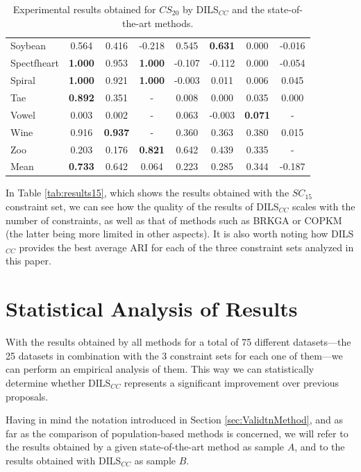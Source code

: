 \documentclass[review]{elsarticle}
\begin{document}
\begin{table}[!h]
{\begin{tabular}{lccccccc}
			Soybean & 0.564 & 0.416 & -0.218 & 0.545 & \textbf{0.631} & 0.000 & -0.016 \\
			Spectfheart & \textbf{1.000} & 0.953 & \textbf{1.000} & -0.107 & -0.112 & 0.000 & -0.054 \\
			Spiral & \textbf{1.000} & 0.921 & \textbf{1.000} & -0.003 & 0.011 & 0.006 & 0.045 \\
			Tae & \textbf{0.892} & 0.351 & - & 0.008 & 0.000 & 0.035 & 0.000 \\
			Vowel & 0.003 & 0.002 & - & 0.063 & -0.003 & \textbf{0.071} & - \\
			Wine & 0.916 & \textbf{0.937} & - & 0.360 & 0.363 & 0.380 & 0.015 \\
			Zoo & 0.203 & 0.176 & \textbf{0.821} & 0.642 & 0.439 & 0.335 & - \\
			\hline
			Mean & \textbf{0.733} & 0.642 & 0.064 & 0.223 & 0.285 & 0.344 & -0.187 \\
			\hline
			
		\end{tabular}}
		
	\caption{Experimental results obtained for $CS_{20}$ by DILS$_{CC}$ and the state-of-the-art methods.}
	\label{tab:results20}
\end{table}
	
In Table \ref{tab:results15}, which shows the results obtained with the $SC_{15}$ constraint set, we can see how the quality of the results of DILS$_{CC}$ scales with the number of constraints, as well as that of methods such as BRKGA or COPKM (the latter being more limited in other aspects). It is also worth noting how DILS$_{CC}$ provides the best average ARI for each of the three constraint sets analyzed in this paper.
	
	
\clearpage

\section{Statistical Analysis of Results} \label{sec:analisis}

With the results obtained by all methods for a total of 75 different datasets---the 25 datasets in combination with the 3 constraint sets for each one of them---we can perform an empirical analysis of them. This way we can statistically determine whether DILS$_{CC}$ represents a significant improvement over previous proposals.

Having in mind the notation introduced in Section \ref{sec:ValidtnMethod}, and as far as the comparison of population-based methods is concerned, we will refer to the results obtained by a given state-of-the-art method as sample $A$, and to the results obtained with DILS$_{CC}$ as sample $B$.
\end{document}
